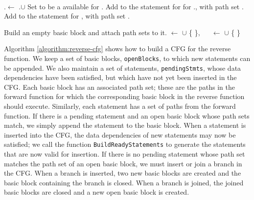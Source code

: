 \begin{algorithm}
\BlankLine


\GetStatements{\valNode, \availablePathSets, \stmts}\\
\Begin
{
	\valNode.\cond $\leftarrow$ \valNode.\cond $\cup$ \availablePathSets \;
	\ForEach{\edge $\in$  \InEdges{\valNode}}
	{
		{
			{
				Set \edge to be a available for \edge.\source \;
				{
					Add to \stmts the statement for for \edge.\source, with path set \edge.\cond \;
				}
			}
		\Else
		{
			Add to \stmts the statement for \edge, with path set \edge.\cond \;
		}}
	}
}
\BlankLine

\BuildBB{\cond}
\Begin
{
	Build an empty basic block \bb and attach path sets \cond to it. \;
	\CFG $\leftarrow$ \CFG $\cup$ \{ \bb \}, $\quad$
	\bbs $\leftarrow$ \bbs $\cup$ \{ \bb \} \;
	\Return{ \bb } \;
}

\end{algorithm}

Algorithm \ref{algorithm:reverse-cfg} shows how to build a CFG for the reverse function. 
We keep a set of basic blocks, \texttt{openBlocks}, to which new statements can be appended.  
We also maintain a set of statements, \texttt{pendingStmts}, whose data dependencies have been satisfied, but which have not yet been inserted in the CFG.
Each basic block has an associated path set; these are the paths in the forward function for which the corresponding basic block in the reverse function should execute.
Similarly, each statement has a set of paths from the forward function. 
If there is a pending statement and an open basic block whose path sets match, we simply append the statement to the basic block.
When a statement is inserted into the CFG, the data dependencies of new statements may now be satisfied; we call the function \texttt{BuildReadyStatements} to generate the statements that are now valid for insertion. 
If there is no pending statement whose path set matches the path set of an open basic block, we must insert or join a branch in the CFG.
When a branch is inserted, two new basic blocks are created and the basic block containing the branch is closed. 
When a branch is joined, the joined basic blocks are closed and a new open basic block is created.

